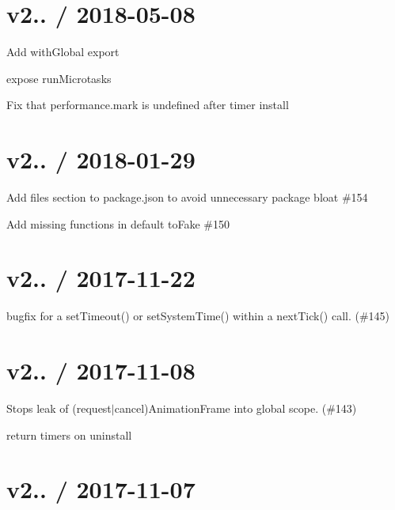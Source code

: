 \section*{v2.. / 2018-\/05-\/08 }


\begin{DoxyItemize}
\item Add {\ttfamily with\+Global} export
\item expose run\+Microtasks
\item Fix that performance.\+mark is undefined after timer install
\end{DoxyItemize}

\section*{v2.. / 2018-\/01-\/29 }


\begin{DoxyItemize}
\item Add files section to package.\+json to avoid unnecessary package bloat \#154
\item Add missing functions in default {\ttfamily to\+Fake} \#150
\end{DoxyItemize}

\section*{v2.. / 2017-\/11-\/22 }


\begin{DoxyItemize}
\item bugfix for a set\+Timeout() or set\+System\+Time() within a next\+Tick() call. (\#145)
\end{DoxyItemize}

\section*{v2.. / 2017-\/11-\/08 }


\begin{DoxyItemize}
\item Stops leak of (request$\vert$cancel)Animation\+Frame into global scope. (\#143)
\item return timers on uninstall
\end{DoxyItemize}

\section*{v2.. / 2017-\/11-\/07 }


